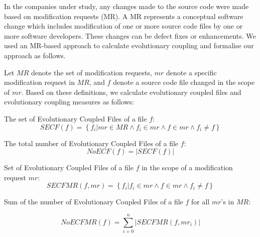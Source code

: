 \documentclass[times]{smrauth}
\begin{document}


In the companies under study, any changes made to the source code were made based on modification requests (MR). A MR represents a conceptual software change which includes modification of one or more source code files by one or more software developers. These changes can be defect fixes or enhancements. We used an MR-based approach to calculate evolutionary coupling and formalise our approach as follows.

Let $MR$ denote the set of modification requests, $mr$ denote a specific modification request in $MR$, and $f$ denote a source code file changed in the scope of $mr$. Based on these definitions, we calculate evolutionary coupled files and evolutionary coupling measures as follows:

The set of Evolutionary Coupled Files of a file $f$:
 \[
  SECF(f) = \left\{ f_{i} \vert mr \in MR  \wedge f_{i} \in mr \wedge f \in mr \wedge f_{i} \ne f  \right\} 
 \]

The total number of Evolutionary Coupled Files of a file $f$:
 \[
  NoECF(f) = \left\vert  SECF(f)  \right\vert  
 \]
 
Set of Evolutionary Coupled Files of a file $f$ in the scope of a modification request $mr$: 
 \[
  SECFMR(f, mr) = \left\{ f_{i} \vert f_{i} \in mr \wedge f \in mr \wedge f_{i} \ne f  \right\} 
 \]

Sum of the number of Evolutionary Coupled Files of a file $f$ for all $mr$'s in $MR$:
 
 \[
  NoECFMR(f) = \sum\limits_{i=0}^n \left\vert  SECFMR(f, mr_{i})  \right\vert  
 \]


%
\end{document}
